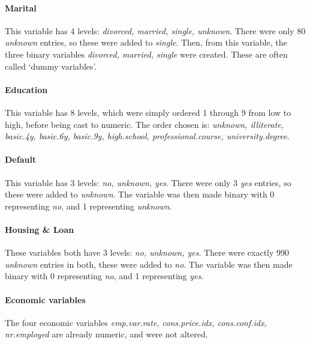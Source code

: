 \documentclass[11pt,]{article}
\let\oldparagraph\paragraph
\renewcommand{\paragraph}[1]{\oldparagraph{#1}\mbox{}}
\begin{document}
\begin{multicols}{2}
\hypertarget{marital}{%
\paragraph{Marital}\label{marital}}

This variable has 4 levels: \emph{divorced, married, single, unknown}.
There were only 80 \emph{unknown} entries, so these were added to
\emph{single}. Then, from this variable, the three binary variables
\emph{divorced, married, single} were created. These are often called
`dummy variables'.

\hypertarget{education}{%
\paragraph{Education}\label{education}}

This variable has 8 levels, which were simply ordered 1 through 9 from
low to high, before being cast to numeric. The order chosen is:
\emph{unknown, illiterate, basic.4y, basic.6y, basic.9y, high.school,
professional.course, university.degree}.

\hypertarget{default}{%
\paragraph{Default}\label{default}}

This variable has 3 levels: \emph{no, unknown, yes}. There were only 3
\emph{yes} entries, so these were added to \emph{unknown}. The variable
was then made binary with 0 representing \emph{no}, and 1 representing
\emph{unknown}.

\hypertarget{housing-loan}{%
\paragraph{Housing \& Loan}\label{housing-loan}}

These variables both have 3 levels: \emph{no, unknown, yes}. There were
exactly 990 \emph{unknown} entries in both, these were added to
\emph{no}. The variable was then made binary with 0 representing
\emph{no}, and 1 representing \emph{yes}.

\hypertarget{economic-variables}{%
\paragraph{Economic variables}\label{economic-variables}}

The four economic variables \emph{emp.var.rate, cons.price.idx,
cons.conf.idx, nr.employed} are already numeric, and were not altered.


\end{multicols}
\end{document}
